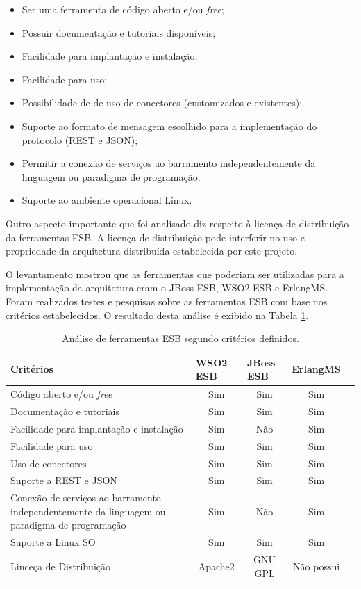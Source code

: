 \begin{itemize}
\item Ser uma ferramenta de código aberto e/ou \textit{free};
\item Possuir documentação e tutoriais disponíveis;
\item Facilidade para implantação e instalação;
\item Facilidade para uso;
\item Possibilidade de de uso de conectores (customizados e existentes);
\item Suporte ao formato de mensagem escolhido para a implementação do protocolo (REST e JSON);
\item Permitir a conexão de serviços ao barramento independentemente da linguagem ou paradigma de programação.
\item Suporte ao ambiente operacional Linux.
\end{itemize}

Outro aspecto importante que foi analisado diz respeito à licença de distribuição da ferramentas ESB. A licença de distribuição pode interferir no uso e propriedade da arquitetura distribuída estabelecida por este projeto.

O levantamento mostrou que as ferramentas que poderiam ser utilizadas para a implementação da arquitetura eram o JBoss ESB, WSO2 ESB e ErlangMS. Foram realizados testes e pesquisas sobre as ferramentas ESB com base nos critérios estabelecidos. O resultado desta análise é exibido na Tabela \ref{analise_ferramentas}.


\begin{table}[!h]
\centering
\caption{Análise de ferramentas ESB segundo critérios definidos.}
\label{analise_ferramentas}
\begin{tabular}{|p{7cm}|c|c|c|c|}
\hline
Critérios & \multicolumn{1}{l|}{WSO2 ESB} & \multicolumn{1}{l|}{JBoss ESB} & \multicolumn{1}{l|}{ErlangMS} \\ \hline
Código aberto e/ou \textit{free} & Sim & Sim & Sim \\ \hline
Documentação e tutoriais         & Sim & Sim & Sim \\ \hline
Facilidade para implantação e instalação     & Sim & Não & Sim \\ \hline
Facilidade para uso              & Sim & Sim & Sim \\ \hline
Uso de conectores                & Sim & Sim & Sim \\ \hline
Suporte a REST e JSON            & Sim & Sim & Sim \\ \hline
Conexão de serviços ao barramento independentemente da linguagem ou paradigma de programação & Sim & Não & Sim \\ \hline
Suporte a Linux SO               & Sim & Sim & Sim\\ \hline
Linceça de Distribuição          & Apache2 & GNU GPL & Não possui \\ \hline
\end{tabular}
\end{table}

